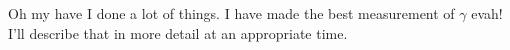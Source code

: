 Oh my have I done a lot of things. I have made the best measurement of $\gamma$ evah! I'll describe that in more detail at an appropriate time.